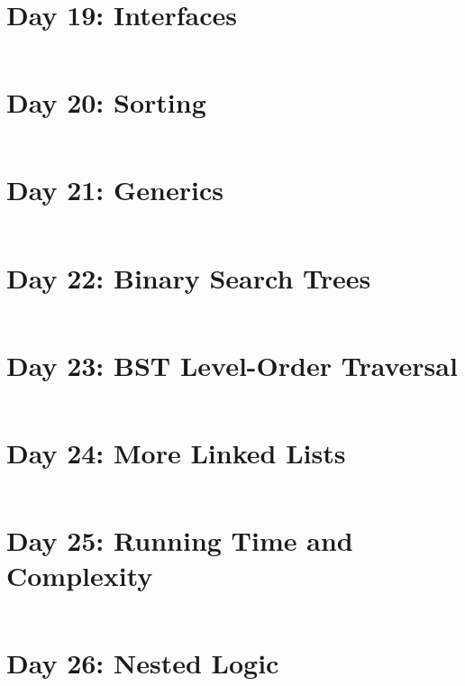 \documentclass[11pt,a4paper]{article}
\begin{document}
\newpage
\section{Day 19: Interfaces}
\begin{lstlisting}
\end{lstlisting}

\newpage
\section{Day 20: Sorting}
\begin{lstlisting}
\end{lstlisting}

\newpage
\section{Day 21: Generics}
\begin{lstlisting}
\end{lstlisting}

\newpage
\section{Day 22: Binary Search Trees}
\begin{lstlisting}
\end{lstlisting}

\newpage
\section{Day 23: BST Level-Order Traversal}
\begin{lstlisting}
\end{lstlisting}

\newpage
\section{Day 24: More Linked Lists}
\begin{lstlisting}
\end{lstlisting}

\newpage
\section{Day 25: Running Time and Complexity}
\begin{lstlisting}
\end{lstlisting}

\newpage
\section{Day 26: Nested Logic}
\begin{lstlisting}
\end{lstlisting}
\end{document}
